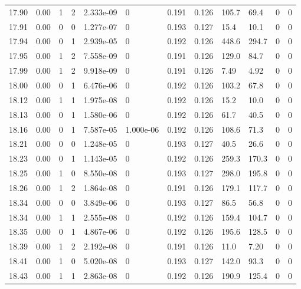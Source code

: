\documentclass[preview]{standalone}
\begin{document}
{{{{{{{{{{{{{{\begin{tabular}{L{1.2cm}C{1.2cm} C{0.3cm}C{0.5cm} C{1.4cm}C{1.4cm} C{1.4cm}C{1.4cm} C{1.6cm}C{1.6cm} C{1.6cm}C{1.6cm}}
  17.90  &  0.00  & 1     &  2 &  2.333e-09  & 0  &  0.191&   0.126& 105.7 & 69.4   &  0 & 0  \\ 
  17.91  &  0.00  & 0     &  0 &  1.277e-07  & 0  &  0.193&   0.127& 15.4 & 10.1   &  0 & 0  \\ 
  17.94  &  0.00  & 0     &  1 &  2.939e-05  & 0  &  0.192&   0.126& 448.6 & 294.7   &  0 & 0  \\ 
  17.95  &  0.00  & 1     &  2 &  7.558e-09  & 0  &  0.191&   0.126& 129.0 & 84.7   &  0 & 0  \\ 
  17.99  &  0.00  & 1     &  2 &  9.918e-09  & 0  &  0.191&   0.126& 7.49 & 4.92   &  0 & 0  \\ 
  18.00  &  0.00  & 0     &  1 &  6.476e-06  & 0  &  0.192&   0.126& 103.2 & 67.8   &  0 & 0  \\ 
  18.12  &  0.00  & 1     &  1 &  1.975e-08  & 0  &  0.192&   0.126& 15.2 & 10.0   &  0 & 0  \\ 
  18.13  &  0.00  & 0     &  1 &  1.580e-06  & 0  &  0.192&   0.126& 61.7 & 40.5   &  0 & 0  \\ 
  18.16  &  0.00  & 0     &  1 &  7.587e-05  & 1.000e-06  &  0.192&   0.126& 108.6 & 71.3   &  0 & 0  \\ 
  18.21  &  0.00  & 0     &  0 &  1.248e-05  & 0  &  0.193&   0.127& 40.5 & 26.6   &  0 & 0  \\ 
  18.23  &  0.00  & 0     &  1 &  1.143e-05  & 0  &  0.192&   0.126& 259.3 & 170.3   &  0 & 0  \\ 
  18.25  &  0.00  & 1     &  0 &  8.550e-08  & 0  &  0.193&   0.127& 298.0 & 195.8   &  0 & 0  \\ 
  18.26  &  0.00  & 1     &  2 &  1.864e-08  & 0  &  0.191&   0.126& 179.1 & 117.7   &  0 & 0  \\ 
  18.34  &  0.00  & 0     &  0 &  3.849e-06  & 0  &  0.193&   0.127& 86.5 & 56.8   &  0 & 0  \\ 
  18.34  &  0.00  & 1     &  1 &  2.555e-08  & 0  &  0.192&   0.126& 159.4 & 104.7   &  0 & 0  \\ 
  18.35  &  0.00  & 0     &  1 &  4.867e-06  & 0  &  0.192&   0.126& 195.6 & 128.5   &  0 & 0  \\ 
  18.39  &  0.00  & 1     &  2 &  2.192e-08  & 0  &  0.191&   0.126& 11.0 & 7.20   &  0 & 0  \\ 
  18.41  &  0.00  & 1     &  0 &  5.020e-08  & 0  &  0.193&   0.127& 142.0 & 93.3   &  0 & 0  \\ 
  18.43  &  0.00  & 1     &  1 &  2.863e-08  & 0  &  0.192&   0.126& 190.9 & 125.4   &  0 & 0  \\ 

\end{tabular}}}}}}}}}}}}}}}
\end{document}
